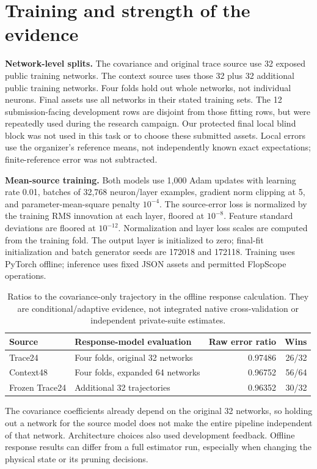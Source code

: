 \documentclass[10pt]{article}
\newcommand{\sectionpage}[1]{\clearpage\section{#1}}
\begin{document}
\sectionpage{Training and strength of the evidence}
\textbf{Network-level splits.} The covariance and original trace source use
32 exposed public training networks. The context source uses those 32 plus
32 additional public training networks. Four folds hold out whole networks,
not individual neurons. Final assets use all networks in their stated
training sets. The 12 submission-facing development rows are disjoint from
those fitting rows, but were repeatedly used during the research campaign.
Our protected final local blind block was not used in this task or to choose
these submitted assets. Local errors use the organizer's reference means,
not independently known exact expectations; finite-reference error was not
subtracted.

\textbf{Mean-source training.} Both models use 1,000 Adam updates with learning
rate 0.01, batches of 32,768 neuron/layer examples, gradient norm clipping at
5, and parameter-mean-square penalty \(10^{-4}\). The source-error loss is
normalized by the training RMS innovation at each layer, floored at
\(10^{-8}\). Feature standard deviations are floored at \(10^{-12}\).
Normalization and layer loss scales are computed from the training fold.
The output layer is initialized to zero; final-fit initialization and batch
generator seeds are 172018 and 172118. Training uses PyTorch offline;
inference uses fixed JSON assets and permitted FlopScope operations.

\begin{table}[h]\centering\small
\begin{tabular}{@{}llrr@{}}\toprule
Source & Response-model evaluation & Raw error ratio & Wins\\\midrule
Trace24 & Four folds, original 32 networks & 0.97486 & 26/32\\
Context48 & Four folds, expanded 64 networks & 0.96752 & 56/64\\
Frozen Trace24 & Additional 32 trajectories & 0.96352 & 30/32\\\bottomrule
\end{tabular}
\caption{Ratios to the covariance-only trajectory in the offline response
calculation. They are conditional/adaptive evidence, not integrated native
cross-validation or independent private-suite estimates.}
\end{table}

The covariance coefficients already depend on the original 32 networks, so
holding out a network for the source model does not make the entire pipeline
independent of that network. Architecture choices also used development
feedback. Offline response results can differ from a full estimator run,
especially when changing the physical state or its pruning decisions.
\end{document}
